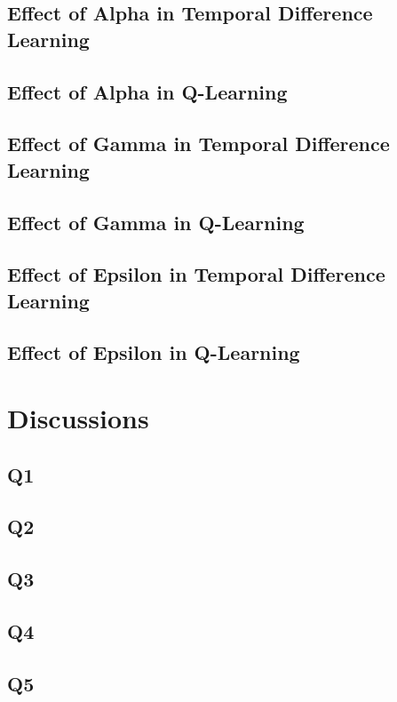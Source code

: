 \documentclass{assignment}
\begin{document}
\subsection{Effect of Alpha in Temporal Difference Learning}

\subsection{Effect of Alpha in Q-Learning}

\subsection{Effect of Gamma in Temporal Difference Learning}

\subsection{Effect of Gamma in Q-Learning}

\subsection{Effect of Epsilon in Temporal Difference Learning}

\subsection{Effect of Epsilon in Q-Learning}

\section{Discussions}
\subsection{Q1}

\subsection{Q2}

\subsection{Q3}

\subsection{Q4}

\subsection{Q5}
\end{document}

